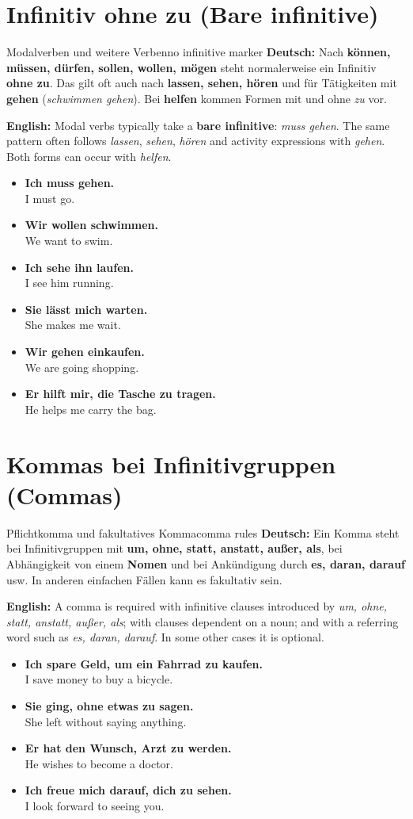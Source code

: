 \documentclass[a4paper,11pt]{article}
\newcommand{\GermanText}[1]{\textbf{Deutsch: }#1\par}
\newcommand{\EnglishText}[1]{{\small\color{SoftGray}\textbf{English: }#1\par}}
\newcommand{\ExampleItem}[2]{\item \textbf{#1}\\{\small\color{SoftGray}#2}}
\begin{document}
\section{Infinitiv ohne zu (Bare infinitive)}
\begin{grammarentry}{Modalverben und weitere Verben}{no infinitive marker}
\GermanText{Nach \textbf{können, müssen, dürfen, sollen, wollen, mögen} steht normalerweise ein Infinitiv \textbf{ohne zu}. Das gilt oft auch nach \textbf{lassen, sehen, hören} und für Tätigkeiten mit \textbf{gehen} (\emph{schwimmen gehen}). Bei \textbf{helfen} kommen Formen mit und ohne \emph{zu} vor.}
\EnglishText{Modal verbs typically take a \textbf{bare infinitive}: \emph{muss gehen}. The same pattern often follows \emph{lassen}, \emph{sehen}, \emph{hören} and activity expressions with \emph{gehen}. Both forms can occur with \emph{helfen}.}
\end{grammarentry}
\begin{exbox}
\begin{itemize}
\ExampleItem{Ich muss gehen.}{I must go.}
\ExampleItem{Wir wollen schwimmen.}{We want to swim.}
\ExampleItem{Ich sehe ihn laufen.}{I see him running.}
\ExampleItem{Sie lässt mich warten.}{She makes me wait.}
\ExampleItem{Wir gehen einkaufen.}{We are going shopping.}
\ExampleItem{Er hilft mir, die Tasche zu tragen.}{He helps me carry the bag.}
\end{itemize}
\end{exbox}

\section{Kommas bei Infinitivgruppen (Commas)}
\begin{grammarentry}{Pflichtkomma und fakultatives Komma}{comma rules}
\GermanText{Ein Komma steht bei Infinitivgruppen mit \textbf{um, ohne, statt, anstatt, außer, als}, bei Abhängigkeit von einem \textbf{Nomen} und bei Ankündigung durch \textbf{es, daran, darauf} usw. In anderen einfachen Fällen kann es fakultativ sein.}
\EnglishText{A comma is required with infinitive clauses introduced by \emph{um, ohne, statt, anstatt, außer, als}; with clauses dependent on a noun; and with a referring word such as \emph{es, daran, darauf}. In some other cases it is optional.}
\end{grammarentry}
\begin{exbox}
\begin{itemize}
\ExampleItem{Ich spare Geld, um ein Fahrrad zu kaufen.}{I save money to buy a bicycle.}
\ExampleItem{Sie ging, ohne etwas zu sagen.}{She left without saying anything.}
\ExampleItem{Er hat den Wunsch, Arzt zu werden.}{He wishes to become a doctor.}
\ExampleItem{Ich freue mich darauf, dich zu sehen.}{I look forward to seeing you.}
\end{itemize}
\end{exbox}
\end{document}
